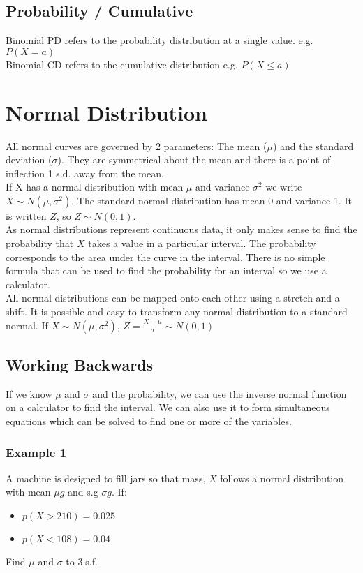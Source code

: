 \documentclass[class=article, crop=false]{standalone}
\begin{document}
\subsection*{Probability / Cumulative }
Binomial PD refers to the probability distribution at a single value. e.g. $P(X=a)$ \\
Binomial CD refers to the cumulative distribution e.g. $P(X \leqslant a)$\\

\section*{Normal Distribution}
All normal curves are governed by 2 parameters: The mean ($\mu$) and the standard deviation ($\sigma$). They are symmetrical about the mean and there is a point of inflection 1 s.d. away from the mean. \\

If X has a normal distribution with mean $\mu$ and variance $\sigma^2$ we write $X \sim N(\mu, \sigma^2)$. The standard normal distribution has mean 0 and variance 1. It is written $Z$, so $Z \sim N(0,1)$. \\

As normal distributions represent continuous data, it only makes sense to find the probability that $X$ takes a value in a particular interval. The probability corresponds to the area under the curve in the interval. There is no simple formula that can be used to find the probability for an interval so we use a calculator.  \\

All normal distributions can be mapped onto each other using a stretch and a shift. It is possible and easy to transform any normal distribution to a standard normal. If $X \sim N(\mu, \sigma^2)$, $Z = \frac{X - \mu}{\sigma} \sim N(0,1)$ \\

\subsection*{Working Backwards}
If we know $\mu$ and $\sigma$ and the probability, we can use the inverse normal function on a calculator to find the interval. We can also use it to form simultaneous equations which can be solved to find one or more of the variables. \\
\subsubsection*{Example 1}
A machine is designed to fill jars so that mass, $X$ follows a normal distribution with mean $\mu g$ and s.g $\sigma g$. If:
\begin{itemize}
	\item $p(X > 210) = 0.025$ 
	\item $p(X < 108) = 0.04$
\end{itemize}
Find $\mu$ and $\sigma$ to 3.s.f. \\ 
\end{document}
